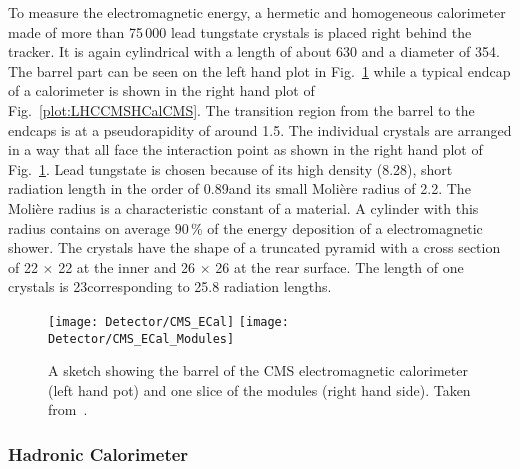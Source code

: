 To measure the electromagnetic energy, a hermetic and homogeneous calorimeter made of more than 75\,000 lead tungstate crystals is placed right behind the tracker. It is again cylindrical with a length of about 630\cm{} and a diameter of 354\cm. The barrel part can be seen on the left hand plot in Fig.~\ref{plot:LHCCMSECalCMS} while a typical endcap of a calorimeter is shown in the right hand plot of Fig.~\ref{plot:LHCCMSHCalCMS}. The transition region from the barrel to the endcaps is at a pseudorapidity of around 1.5. The individual crystals are arranged in a way that all face the interaction point as shown in the right hand plot of Fig.~\ref{plot:LHCCMSECalCMS}. Lead tungstate is chosen because of its high density (8.28\gcmc{}), short radiation length in the order of 0.89\cm and its small Moli\`ere radius of 2.2\cm{}. The Moli\`ere radius is a characteristic constant of a material. A cylinder with this radius contains on average $90\,\%$ of the energy deposition of a electromagnetic shower. The crystals have the shape of a truncated pyramid with a cross section of 22 $\times{}$ 22\mms{} at the inner and 26 $\times{}$ 26\mms{} at the rear surface. The length of one crystals is 23\cm corresponding to 25.8 radiation lengths.

\begin{figure}[Htb]
  \centering
  \texttt{[image: Detector/CMS\_ECal]}
  \texttt{[image: Detector/CMS\_ECal\_Modules]}
  \caption[Sketches of the electromagnetic calorimeter of CMS]{A sketch showing the barrel of the CMS electromagnetic calorimeter (left hand pot) and one slice of the modules (right hand side). Taken from~. \label{plot:LHCCMSECalCMS}}
\end{figure}

\subsubsection{Hadronic Calorimeter}

